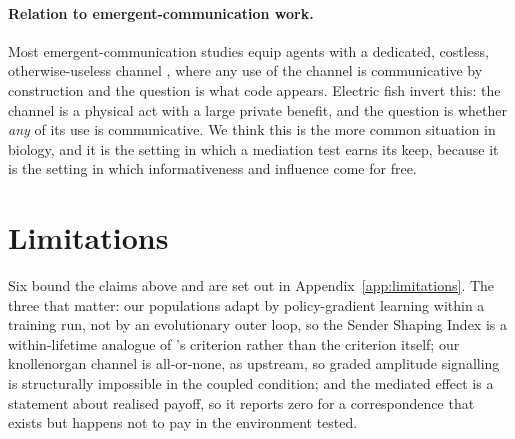 \paragraph{Relation to emergent-communication work.}
Most emergent-communication studies equip agents with a dedicated, costless,
otherwise-useless channel \citep{foerster2016learning,mordatch2018emergence,lazaridou2017multi},
where any use of the channel is communicative by construction and the question is
what code appears. Electric fish invert this: the channel is a physical act with a
large private benefit, and the question is whether \emph{any} of its use is
communicative. We think this is the more common situation in biology, and it is
the setting in which a mediation test earns its keep, because it is the setting in
which informativeness and influence come for free.

\section{Limitations}

Six bound the claims above and are set out in Appendix~\ref{app:limitations}. The
three that matter: our populations adapt by policy-gradient learning within a
training run, not by an evolutionary outer loop, so the Sender Shaping Index is a
within-lifetime analogue of \citeauthor{scottphillips2008defining}'s criterion
rather than the criterion itself; our knollenorgan channel is all-or-none, as
upstream, so graded amplitude signalling is structurally impossible in the coupled
condition; and the mediated effect is a statement about realised payoff, so it
reports zero for a correspondence that exists but happens not to pay in the
environment tested.
